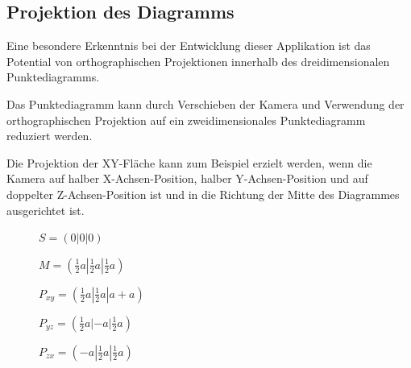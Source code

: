\subsection{Projektion des Diagramms}

Eine besondere Erkenntnis bei der Entwicklung dieser Applikation ist das Potential von orthographischen Projektionen innerhalb des dreidimensionalen Punktediagramms.

Das Punktediagramm kann durch Verschieben der Kamera und Verwendung der orthographischen Projektion auf ein zweidimensionales Punktediagramm reduziert werden.

Die Projektion der XY-Fläche kann zum Beispiel erzielt werden, wenn die Kamera auf halber X-Achsen-Position, halber Y-Achsen-Position und auf doppelter Z-Achsen-Position ist und in die Richtung der Mitte des Diagrammes ausgerichtet ist.

\begin{figure}[H]

	$S = (0|0|0)$
	
	$M = (\frac{1}{2} a | \frac{1}{2} a | \frac{1}{2} a)$
	
	$P_{xy} = (\frac{1}{2} a | \frac{1}{2} a| a + a)$
	
	$P_{yz} = (\frac{1}{2} a | -a| \frac{1}{2} a)$
	
	$P_{zx} = (-a | \frac{1}{2} a| \frac{1}{2} a)$
\end{figure}

